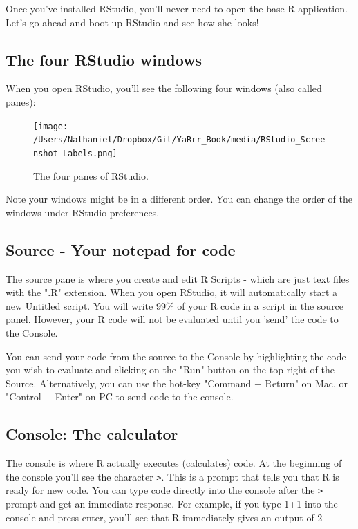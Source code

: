 \documentclass{tufte-book}\usepackage[]{graphicx}\usepackage[]{color}
\begin{document}
Once you've installed RStudio, you'll never need to open the base R application. Let's go ahead and boot up RStudio and see how she looks!

\subsection{The four RStudio windows}

When you open RStudio, you'll see the following four windows (also called panes):

\begin{figure}[h]
\texttt{[image: /Users/Nathaniel/Dropbox/Git/YaRrr\_Book/media/RStudio\_Screenshot\_Labels.png]}
\caption{The four panes of RStudio.}
\label{fig:fullfig}
\end{figure}

Note your windows might be in a different order. You can change the order of the windows under RStudio preferences.

\subsection{Source - Your notepad for code}

The source pane is where you create and edit R Scripts - which are just text files with the ".R" extension. When you open RStudio, it will automatically start a new Untitled script. You will write 99\% of your R code in a script in the source panel. However, your R code will not be evaluated until you 'send' the code to the Console.

You can send your code from the source to the Console by highlighting the code you wish to evaluate and clicking on the "Run" button on the top right of the Source. Alternatively, you can use the hot-key "Command + Return" on Mac, or "Control + Enter" on PC to send code to the console.



\subsection{Console: The calculator}

The console is where R actually executes (calculates) code. At the beginning of the console you'll see the character \texttt{>}. This is a prompt that tells you that R is ready for new code. You can type code directly into the console after the \texttt{>} prompt and get an immediate response. For example, if you type 1+1 into the console and press enter, you'll see that R immediately gives an output of 2
\end{document}

